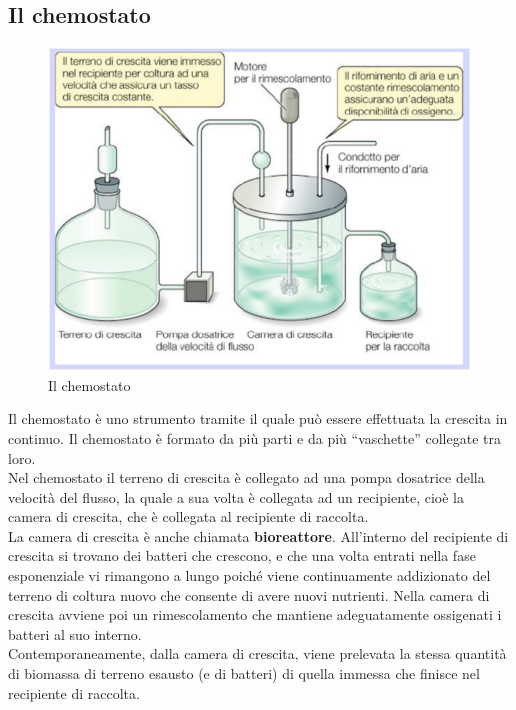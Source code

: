 \documentclass[11pt]{book}
\begin{document}
\clearpage
\subsection{Il chemostato}
\begin{figure}[htp]
\centering
\includegraphics[scale=0.5]{img/Chemostato.png}
\caption{Il chemostato}
\label{}
\end{figure}

Il chemostato è uno strumento tramite il quale può essere effettuata la crescita in continuo. Il chemostato è formato da più parti e da più ``vaschette'' collegate tra loro.\\

Nel chemostato il terreno di crescita è collegato ad una pompa dosatrice della velocità del flusso, la quale a sua volta è collegata ad un recipiente, cioè la camera di crescita, che è collegata al recipiente di raccolta.\\
La camera di crescita è anche chiamata \textbf{bioreattore}. All’interno del recipiente di crescita si trovano dei batteri che crescono, e che una volta entrati nella fase esponenziale vi rimangono a lungo poiché viene continuamente addizionato del terreno di coltura nuovo che consente di avere nuovi nutrienti. Nella camera di crescita avviene poi un rimescolamento che mantiene adeguatamente ossigenati i batteri al suo interno.\\
Contemporaneamente, dalla camera di crescita, viene prelevata la stessa quantità di biomassa di terreno esausto (e di batteri) di quella immessa che finisce nel recipiente di raccolta.
\end{document}
